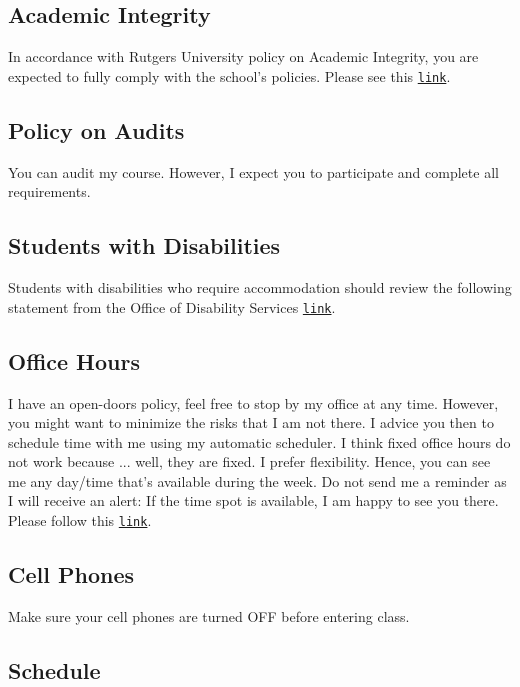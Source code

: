 \documentclass[letterpaper]{article}
\begin{document}
\subsection*{Academic Integrity}
In accordance with Rutgers University policy on Academic Integrity, you are expected to fully comply with the school's policies.  Please see this \href{http://academicintegrity.rutgers.edu}{\texttt{link}}.

\subsection*{Policy on Audits}
You can audit my course. However, I expect you to participate and complete all requirements. 

\subsection*{Students with Disabilities}
Students with disabilities who require accommodation should review the following statement from the Office of Disability Services \href{https://ods.rutgers.edu/faculty/syllabus}{\texttt{link}}.

\subsection*{Office Hours}

I have an open-doors policy, feel free to stop by my office at any time. However, you might want to minimize the risks that I am not there. I advice you then to schedule time with me using my automatic scheduler. I think fixed office hours do not work because ... well, they are fixed. I prefer flexibility. Hence, you can see me any day/time that's available during the week. Do not send me a reminder as I will receive an alert: If the time spot is available, I am happy to see you there. Please follow this \href{https://calendly.com/bahamonde/officehours}{\texttt{link}}.


\subsection*{Cell Phones} 

Make sure your cell phones are turned OFF before entering class.


\subsection*{Schedule}
\end{document}
